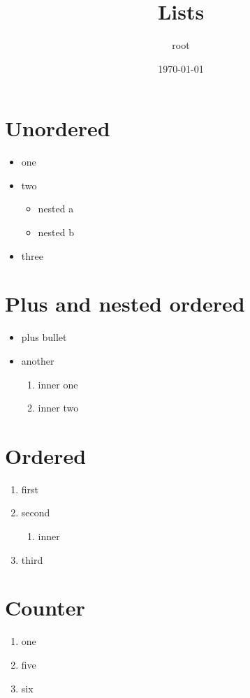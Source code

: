 \documentclass[11pt]{article}
\author{root}
\date{\today}
\title{Lists}
\begin{document}
\maketitle
\tableofcontents

\section{Unordered}
\label{sec:orgca023d3}
\begin{itemize}
\item one
\item two
\begin{itemize}
\item nested a
\item nested b
\end{itemize}
\item three
\end{itemize}
\section{Plus and nested ordered}
\label{sec:orgc3ec209}
\begin{itemize}
\item plus bullet
\item another
\begin{enumerate}
\item inner one
\item inner two
\end{enumerate}
\end{itemize}
\section{Ordered}
\label{sec:org5b0c982}
\begin{enumerate}
\item first
\item second
\begin{enumerate}
\item inner
\end{enumerate}
\item third
\end{enumerate}
\section{Counter}
\label{sec:orga1025c7}
\begin{enumerate}
\item one
\setcounter{enumi}{4}
\item five
\item six
\end{enumerate}
\end{document}
